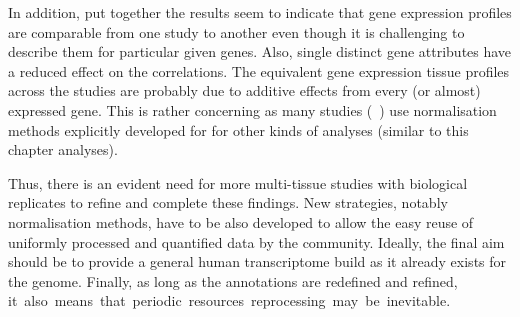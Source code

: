In addition,
put together the results seem to indicate that
gene expression profiles are comparable from one study to another even though
it is challenging to describe them for particular given genes.
Also, single distinct gene attributes have a reduced effect on the correlations.
The equivalent gene expression tissue profiles across the studies
are probably due to additive effects from every (or almost) expressed gene.
This is rather concerning as many studies (\eg{}~\cite{Sudmant2015-zt})
use normalisation methods explicitly developed for 
for other kinds of analyses (similar to this chapter analyses).


Thus, there is an evident need for more multi-tissue studies
with biological replicates to refine and complete these findings.
New strategies, notably normalisation methods, have to be also developed
to allow the easy reuse of uniformly processed and quantified data by
the community.
Ideally, the final aim should be to provide a general human transcriptome build
as it already exists for the genome.
Finally, as long as the annotations are redefined and refined,
it~also~means~that~periodic~resources~reprocessing~may~be~inevitable.


